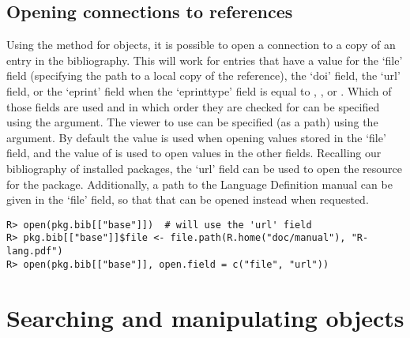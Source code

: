 \documentclass[article]{jss}\usepackage[]{graphicx}\usepackage[]{color}
\makeatletter
\newenvironment{kframe}{%
 \def\at@end@of@kframe{}%
 \ifinner\ifhmode%
  \def\at@end@of@kframe{\end{minipage}}%
  \begin{minipage}{\columnwidth}%
 \fi\fi%
 \def\FrameCommand##1{\hskip\@totalleftmargin \hskip-\fboxsep
 \colorbox{shadecolor}{##1}\hskip-\fboxsep
     \hskip-\linewidth \hskip-\@totalleftmargin \hskip\columnwidth}%
 \MakeFramed {\advance\hsize-\width
   \@totalleftmargin\z@ \linewidth\hsize
   \@setminipage}}%
 {\par\unskip\endMakeFramed%
 \at@end@of@kframe}
\newenvironment{knitrout}{}{} %
\makeatother
\begin{document}
\subsection{Opening connections to references}\label{sec_open}
Using the  method for  objects, it is possible to open a connection to a copy of an entry in the bibliography.  This will work for entries that have a value for the `file' field (specifying the path to a local copy of the reference), the `doi' field, the `url' field, or the `eprint' field when the `eprinttype' field is equal to , , or .  Which of those fields are used and in which order they are checked for can be specified using the  argument.  The viewer to use can be specified (as a path) using the  argument.  By default the value  is used when opening values stored in the `file' field, and the value of  is used to open values in the other fields.  Recalling our bibliography of installed packages, the `url' field can be used to open the resource for the  package.  Additionally, a path to the \R{} Language Definition manual can be given in the `file' field, so that that can be opened instead when requested.
\begin{knitrout}
\color{fgcolor}\begin{kframe}
\begin{verbatim}
R> open(pkg.bib[["base"]])  # will use the 'url' field
R> pkg.bib[["base"]]$file <- file.path(R.home("doc/manual"), "R-lang.pdf")
R> open(pkg.bib[["base"]], open.field = c("file", "url"))
\end{verbatim}
\end{kframe}
\end{knitrout}


\section[Searching and manipulating BibEntry objects]{Searching and manipulating  objects}\label{sec_manip}
\end{document}
